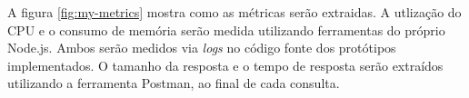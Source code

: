 A figura \ref{fig:my-metrics} mostra como as métricas serão extraidas. A utlização do CPU e o consumo de memória serão medida utilizando ferramentas do próprio Node.js. Ambos serão medidos via \textit{logs} no código fonte dos protótipos implementados. O tamanho da resposta e o tempo de resposta serão extraídos utilizando a ferramenta Postman, ao final de cada consulta.